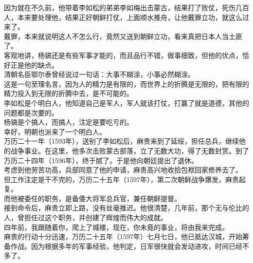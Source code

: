 \begin{multicols}{\theparacolNo}
因为就在不久前，他带着李如松的弟弟李如梅出击蒙古，结果打了败仗，死伤几百人，本来要处理他，结果正好朝鲜打仗，上面顺水推舟，让他戴罪立功，就这么过来了。\\

戴罪，本来就说明这人不怎么行，竟然又送到朝鲜立功，看来真把日本人当土匪了。\\

客观地讲，杨镐还是有些军事才能的，而且品行不错，做事细致，但他的优点，恰好正是他的缺点。\\

清朝名臣鄂尔泰曾经说过一句话：大事不糊涂，小事必然糊涂。\\

这是一句至理名言，因为人的精力是有限的，而世界上的折腾是无限的，把有限的精力投入到无限的折腾中去，是不可能的。\\

李如松是个明白人，他知道自己是军人，军人就该打仗，打赢了就是道德，其他的问题都是次要的。\\

杨镐是个搞人，而搞人，注定是要吃亏的。\\

幸好，明朝也派来了一个明白人。\\

万历二十一年（1593年），送别了李如松后，麻贵来到了延绥，担任总兵，继续他的战争事业。在这里，他多次击败蒙古部落，立了无数大功，得了无数封赏。到了万历二十四年（1596年），终于腻了。于是他向朝廷提出了退休。\\

考虑到他劳苦功高，兵部同意了他的申请，麻贵高兴地收拾包袱回家修养去了。\\

但工作注定是干不完的，万历二十五年（1597年），第二次朝鲜战争爆发，麻贵起复。\\

而他被委任的职务，是备倭大将军总兵官，兼任朝鲜提督。\\

接到命令后，麻贵立即上路，没有丝毫推迟。他很清楚，几年前，那个无与伦比的人，曾担任过这个职务，并创建了辉煌而伟大的成就。\\

四年前，我跟随着你，爬上了城楼，现在，你未竟的事业，将由我来完成。\\

麻贵的行动十分迅速，万历二十五年（1597年）七月七日，他已抵达汉城，开始筹备作战。因为根据多年的军事经验，他判定，日军很快就会发动进攻，时间已经不多了。\\


\end{multicols}
